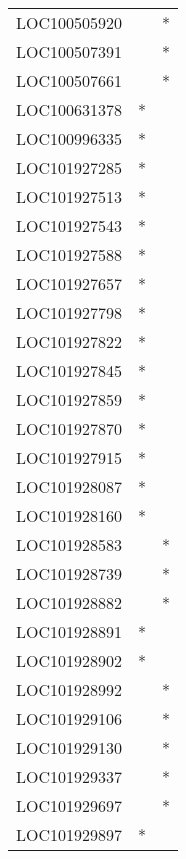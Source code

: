 \begin{longtable}{lcc}
LOC100505920     &                &          * \\
LOC100507391     &                &          * \\
LOC100507661     &                &          * \\
LOC100631378     &              * &            \\
LOC100996335     &              * &            \\
LOC101927285     &              * &            \\
LOC101927513     &              * &            \\
LOC101927543     &              * &            \\
LOC101927588     &              * &            \\
LOC101927657     &              * &            \\
LOC101927798     &              * &            \\
LOC101927822     &              * &            \\
LOC101927845     &              * &            \\
LOC101927859     &              * &            \\
LOC101927870     &              * &            \\
LOC101927915     &              * &            \\
LOC101928087     &              * &            \\
LOC101928160     &              * &            \\
LOC101928583     &                &          * \\
LOC101928739     &                &          * \\
LOC101928882     &                &          * \\
LOC101928891     &              * &            \\
LOC101928902     &              * &            \\
LOC101928992     &                &          * \\
LOC101929106     &                &          * \\
LOC101929130     &                &          * \\
LOC101929337     &                &          * \\
LOC101929697     &                &          * \\
LOC101929897     &              * &            \\

\end{longtable}
